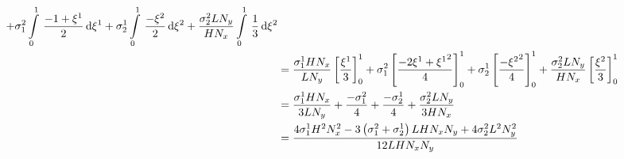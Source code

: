 \begin{equation}
\begin{aligned}
    +\conductivitytensorsymbol^{2}_{1}\gint{0}{1}{\dfrac{-1+\xione}{2}}{\xione}
    +\conductivitytensorsymbol^{1}_{2}\gint{0}{1}{\dfrac{-\xitwo}{2}}{\xitwo}
    +\dfrac{\conductivitytensorsymbol^{2}_{2} L N_{y}}{H N_{x}}\gint{0}{1}{\dfrac{1}{3}}{\xitwo} \\
    &=\dfrac{\conductivitytensorsymbol^{1}_{1} H N_{x}}{L N_{y}}\sqbrac{\dfrac{\xione}{3}}^{1}_{0}
    +\conductivitytensorsymbol^{2}_{1}\sqbrac{\dfrac{-2\xione+\xionesq}{4}}^{1}_{0}
    +\conductivitytensorsymbol^{1}_{2}\sqbrac{\dfrac{-\xitwosq}{4}}^{1}_{0}
    +\dfrac{\conductivitytensorsymbol^{2}_{2} L N_{y}}{H N_{x}}\sqbrac{\dfrac{\xitwo}{3}}^{1}_{0} \\
    &=\dfrac{\conductivitytensorsymbol^{1}_{1} H N_{x}}{3 L N_{y}}+\dfrac{-\conductivitytensorsymbol^{2}_{1}}{4}+
    \dfrac{-\conductivitytensorsymbol^{1}_{2}}{4}+\dfrac{\conductivitytensorsymbol^{2}_{2} L N_{y}}{3 H N_{x}} \\
    &=\dfrac{4\conductivitytensorsymbol^{1}_{1}H^{2}N_{x}^{2}-3\pbrac{\conductivitytensorsymbol^{2}_{1}+
        \conductivitytensorsymbol^{1}_{2}}L H N_{x} N_{y}+4\conductivitytensorsymbol^{2}_{2}L^{2}N_{y}^{2}}{12 L H N_{x} N_{y}}
  \end{aligned}
\end{equation}

